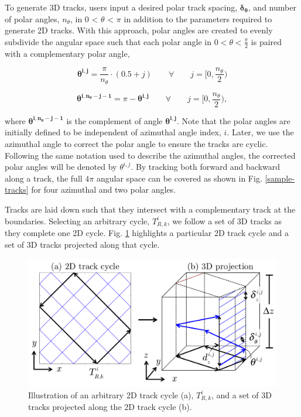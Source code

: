 \noindent
To generate 3D tracks, users input a desired polar track spacing, $\boldsymbol{\delta_\theta}$, and number of polar angles, $n_{\theta}$, in 0 < $\theta$ < $\pi$ in addition to the parameters required to generate 2D tracks. With this approach, polar angles are created to evenly subdivide the angular space such that each polar angle in $0 < \theta < \frac{\pi}{2}$ is paired with a complementary polar angle,

\begin{equation}
\boldsymbol{\theta^{i,j}} = \frac{\pi}{n_{\theta}} \cdot (0.5 + j) \qquad \forall \qquad j = \Big[0,\frac{n_{\theta}}{2}\Big)
\end{equation}

\begin{equation}
\boldsymbol{\theta^{i,n_{\theta} - j - 1}} = \pi - \boldsymbol{\theta^{i,j}} \qquad \forall \qquad j= \Big[0,\frac{n_{\theta}}{2}\Big),
\end{equation} 

\noindent
where $\boldsymbol{\theta^{i,n_{\theta} - j - 1}}$ is the complement of angle $\boldsymbol{\theta^{i,j}}$. Note that the polar angles are initially defined to be independent of azimuthal angle index, $i$. Later, we use the azimuthal angle to correct the polar angle to ensure the tracks are cyclic. Following the same notation used to describe the azimuthal angles, the corrected polar angles will be denoted by $\theta^{i,j}$. By tracking both forward and backward along a track, the full $4 \pi$ angular space can be covered as shown in Fig. \ref{sample-tracks} for four azimuthal and two polar angles.

Tracks are laid down such that they intersect with a complementary track at the boundaries. Selecting an arbitrary cycle, $T_{R,k}^{i}$, we follow a set of 3D tracks as they complete one 2D cycle. Fig. \ref{figure 3} highlights a particular 2D track cycle and a set of 3D tracks projected along that cycle.

\begin{figure}[h]
	\vspace{-0.1in}
	\centering
	\includegraphics[width=4.5in]{figures/mc2015/track_cycles_3.png}
	\caption{Illustration of an arbitrary 2D track cycle (a), $T_{R,k}^{i}$, and a set of 3D tracks projected along the 2D track cycle (b).}
	\label{figure 3}
\end{figure}

